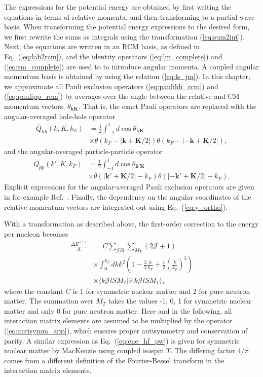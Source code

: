 \documentclass[a4paper,12pt]{report}
\begin{document}
The expressions for the potential energy are obtained by first writing the 
equations in terms of relative momenta, and then transforming to a 
partial-wave basis. When transforming the potential energy expressions to 
the desired form, we first rewrite the sums as integrals using the 
transformation (\ref{eq:sum2int}). Next, the equations are written in an 
RCM basis, as defined in Eq.~(\ref{eq:lab2rcm}), and the identity operators 
(\ref{eq:lm_complete}) and (\ref{eq:sm_complete}) are used to to introduce 
angular momenta. A coupled angular momentum basis is obtained by using the 
relation (\ref{eq:ls_jm}). In this chapter, we approximate all Pauli 
exclusion operators (\ref{eq:paulihh_rcm}) and (\ref{eq:paulipp_rcm}) 
by averages over the angle between the relative and CM momentum vectors, 
$\theta_{\mathbf{k}\mathbf{K}}$. That is, the exact Pauli operators are 
replaced with the angular-averaged hole-hole operator
\begin{align}
  \overline{Q}_{hh}(k, K, k_{F}) &= \frac{1}{2}\int_{-1}^{1}d\cos \theta_{\mathbf{k}\mathbf{K}} \nonumber \\
  & \times \theta(k_{F}-|\mathbf{k}+\mathbf{K}/2|)\theta(k_{F}-|-\mathbf{k}+\mathbf{K}/2|),
  \label{eq:pauli_ave_hh}
\end{align}
and the angular-averaged particle-particle operator
\begin{align}
  \overline{Q}_{pp}(k', K, k_{F}) &= \frac{1}{2}\int_{-1}^{1}d\cos \theta_{\mathbf{k}'\mathbf{K}} \nonumber \\
  & \times \theta(|\mathbf{k}'+\mathbf{K}/2|-k_{F})\theta(|-\mathbf{k}'+\mathbf{K}/2|-k_{F}).
  \label{eq:pauli_ave_pp}
\end{align}
Explicit expressions for the angular-averaged Pauli exclusion operators 
are given in for example Ref.~\cite{ramos_polls}.
Finally, the dependency on the angular coordinates of the relative momentum 
vectors are integrated out using Eq.~(\ref{eq:y_ortho}). 

With a transformation as described above, the first-order correction to 
the energy per nucleon becomes
\begin{align}
  \frac{\Delta E^{(1)}}{A} &= C \sum_{\mathcal{J}Sl}\sum_{M_{T}} (2\mathcal{J}+1) \nonumber \\
  & \times \int_{0}^{k_{F}}dk k^{2}\left( 1 - \frac{3}{2}\frac{k}{k_{F}} + \frac{1}{2}\left( \frac{k}{k_{F}}\right)^{3} \right) \nonumber \\
  & \times \langle k\mathcal{J}lSM_{T}|\hat{v}|k\mathcal{J}lSM_{T}\rangle ,
  \label{eq:ene_hf_pw}
\end{align}
where the constant $C$ is 1 for symmetric nuclear matter and 2 for pure 
neutron matter. The summation over $M_{T}$ takes the values -1, 0, 1 for 
symmetric nuclear matter and only 0 for pure neutron matter. Here and in 
the following, all interaction matrix elements are assumed to be multiplied 
by the operator (\ref{eq:antisymm_app}), which ensures proper antisymmetry 
and conservation of parity. A similar expression as Eq.~(\ref{eq:ene_hf_pw}) 
is given for symmetric nuclear matter by MacKenzie \cite{mackenzie} using 
coupled isospin $T$. The differing factor $4/\pi $ comes from a different 
definition of the Fourier-Bessel transform in the interaction matrix elements. 
\end{document}
